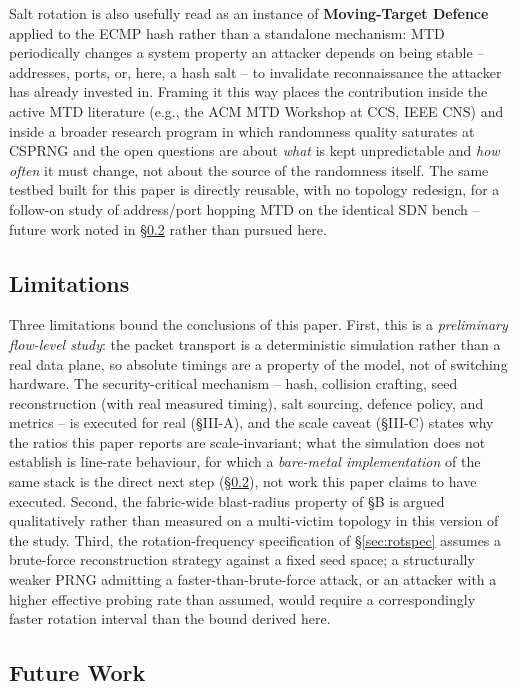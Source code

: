 \documentclass[conference]{IEEEtran}
\begin{document}
Salt rotation is also usefully read as an instance of \textbf{Moving-Target Defence} applied to the ECMP hash
rather than a standalone mechanism: MTD periodically changes a system property an attacker depends on being
stable -- addresses, ports, or, here, a hash salt -- to invalidate reconnaissance the attacker has already
invested in. Framing it this way places the contribution inside the active MTD literature (e.g., the ACM MTD
Workshop at CCS, IEEE CNS) and inside a broader research program in which randomness quality saturates at CSPRNG
and the open questions are about \emph{what} is kept unpredictable and \emph{how often} it must change, not
about the source of the randomness itself. The same testbed built for this paper is directly reusable, with no
topology redesign, for a follow-on study of address/port hopping MTD on the identical SDN bench -- future work
noted in \S\ref{sec:futurework} rather than pursued here.

\subsection{Limitations}
\label{sec:limitations}

Three limitations bound the conclusions of this paper. First, this is a \emph{preliminary flow-level study}:
the packet transport is a deterministic simulation rather than a real data plane, so absolute timings are a
property of the model, not of switching hardware. The security-critical mechanism -- hash, collision crafting,
seed reconstruction (with real measured timing), salt sourcing, defence policy, and metrics -- is executed for
real (\S III-A), and the scale caveat (\S III-C) states why the ratios this paper reports are scale-invariant;
what the simulation does not establish is line-rate behaviour, for which a \emph{bare-metal implementation} of
the same stack is the direct next step (\S\ref{sec:futurework}), not work this paper claims to have executed. Second, the fabric-wide blast-radius property of
\S B is argued qualitatively rather than measured on a multi-victim topology in this version of the study. Third,
the rotation-frequency specification of \S\ref{sec:rotspec} assumes a brute-force reconstruction strategy against
a fixed seed space; a structurally weaker PRNG admitting a faster-than-brute-force attack, or an attacker with a
higher effective probing rate than assumed, would require a correspondingly faster rotation interval than the
bound derived here.

\subsection{Future Work}
\label{sec:futurework}
\end{document}
